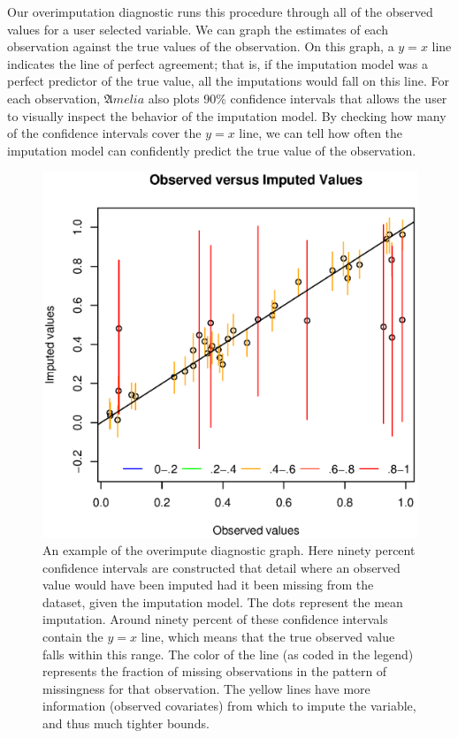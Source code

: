 \documentclass[12pt,titlepage]{article}
\newcommand{\Amelia}{\ensuremath{\mathfrak Amelia} }
\begin{document}
Our overimputation diagnostic runs this procedure through all of the observed values for a user selected variable.  We can graph the estimates of each observation against the true values of the observation.  On this graph, a $y=x$ line indicates the line of perfect agreement; that is, if the imputation model was a perfect predictor of the true value, all the imputations would fall on this line.  For each observation, \Amelia also plots 90\% confidence intervals that allows the user to visually inspect the behavior of the imputation model. By checking how many of the confidence intervals cover the $y=x$ line, we can tell how often the imputation model can confidently predict the true value of the observation.  


\begin{figure}[htp!]\label{f:oi}
  \centering
  \includegraphics[scale=.8]{overimp.eps}
  \caption{ An example of the overimpute diagnostic graph.  Here ninety percent confidence intervals are constructed that detail where an observed value would have been imputed had it been missing from the dataset, given the imputation model.  The dots represent the mean imputation.  Around ninety percent of these confidence intervals contain the $y=x$ line, which means that the true observed value falls within this range.  The color of the line (as coded in the legend) represents the fraction of missing observations in the pattern of missingness for that observation.  The yellow lines have more information (observed covariates) from which to impute the variable, and thus much tighter bounds.}
\end{figure}
\end{document}

